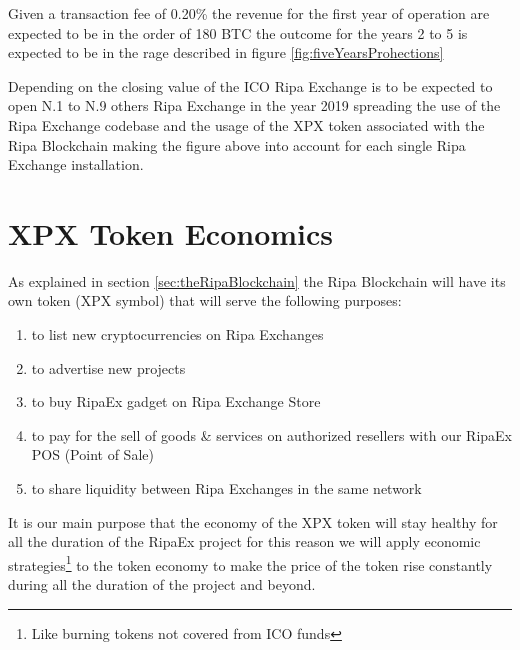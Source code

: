 \documentclass[11pt,fleqn,oneside]{book} %
\begin{document}
Given a transaction fee of 0.20\% the revenue for the first year of operation are expected to be in the order of 180 BTC the 
outcome for the years 2 to 5 is expected to be in the rage described in figure \ref{fig:fiveYearsProhections} 
\begin{center}
	\label{fig:fiveYearsProhections}
\end{center}

Depending on the closing value of the ICO Ripa Exchange is to be expected to open N.1 to N.9 others Ripa Exchange in 
the year 2019 spreading the use of the Ripa Exchange codebase and the usage of the XPX token associated with the 
Ripa Blockchain making the figure above into account for each single Ripa Exchange installation.

\section{XPX Token Economics}
As explained in section \ref{sec:theRipaBlockchain} the Ripa Blockchain will have its own \PHP token (XPX symbol) that 
will serve the following purposes:
	\begin{enumerate}
		\item to list new cryptocurrencies on Ripa Exchanges
		\item to advertise new projects
		\item to buy RipaEx gadget on Ripa Exchange Store
		\item to pay for the sell of goods \& services on authorized resellers with our RipaEx POS (Point of Sale)
		\item to share liquidity between Ripa Exchanges in the same network
	\end{enumerate}
It is our main purpose that the economy of the XPX token will stay healthy for all the duration of the RipaEx project for 
this reason we will apply economic strategies\footnote{Like burning tokens not covered from ICO funds} 
to the token economy to make the price of the token rise constantly during all the duration of the project and beyond.
\end{document}

